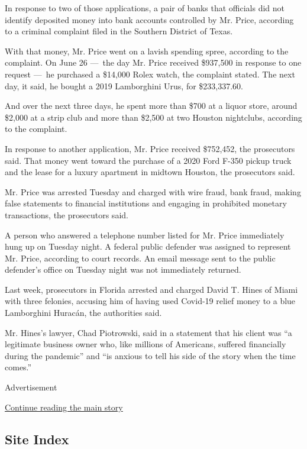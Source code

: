 In response to two of those applications, a pair of banks that officials
did not identify deposited money into bank accounts controlled by Mr.
Price, according to a criminal complaint filed in the Southern District
of Texas.

With that money, Mr. Price went on a lavish spending spree, according to
the complaint. On June 26 ---~the day Mr. Price received \$937,500 in
response to one request ---~he purchased a \$14,000 Rolex watch, the
complaint stated. The next day, it said, he bought a 2019 Lamborghini
Urus, for \$233,337.60.

And over the next three days, he spent more than \$700 at a liquor
store, around \$2,000 at a strip club and more than \$2,500 at two
Houston nightclubs, according to the complaint.

In response to another application, Mr. Price received \$752,452, the
prosecutors said. That money went toward the purchase of a 2020 Ford
F-350 pickup truck and the lease for a luxury apartment in midtown
Houston, the prosecutors said.

Mr. Price was arrested Tuesday and charged with wire fraud, bank fraud,
making false statements to financial institutions and engaging in
prohibited monetary transactions, the prosecutors said.

A person who answered a telephone number listed for Mr. Price
immediately hung up on Tuesday night. A federal public defender was
assigned to represent Mr. Price, according to court records. An email
message sent to the public defender's office on Tuesday night was not
immediately returned.

Last week, prosecutors in Florida arrested and charged David T. Hines of
Miami with three felonies, accusing him of having used Covid-19 relief
money to a blue Lamborghini Huracán, the authorities said.

Mr. Hines's lawyer, Chad Piotrowski, said in a statement that his client
was ``a legitimate business owner who, like millions of Americans,
suffered financially during the pandemic'' and ``is anxious to tell his
side of the story when the time comes.''

Advertisement

\protect\hyperlink{after-bottom}{Continue reading the main story}

\hypertarget{site-index}{%
\subsection{Site Index}\label{site-index}}


